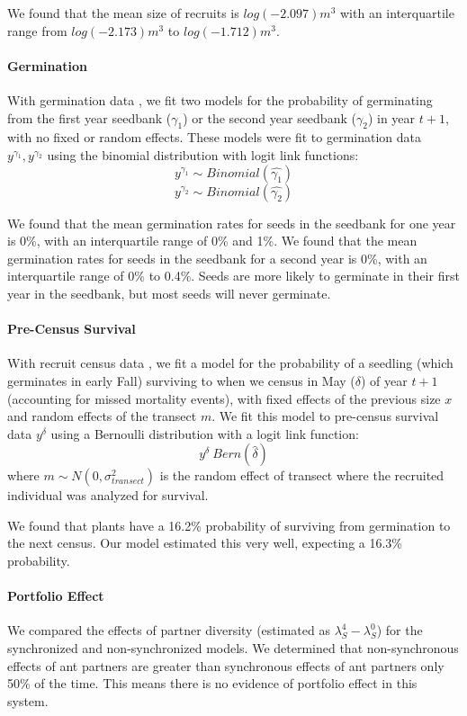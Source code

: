 \documentclass[11pt]{article}
\begin{document}
We found that the mean size of recruits is $log(-2.097) m^3$ with an interquartile range from $log(-2.173) m^3$ to $log(-1.712) m^3$.



\paragraph{Germination}
With germination data \cite{Miller2007}, we fit two models for the probability of germinating from the first year seedbank ($\gamma_1$) or the second year seedbank ($\gamma_2$) in year $t+1$, with no fixed or random effects.
These models were fit to germination data $y^{\gamma_1}, y^{\gamma_2}$  using the binomial distribution with logit link functions:
$$y^{\gamma_1} \sim Binomial(\hat{\gamma_1})$$
$$y^{\gamma_2} \sim Binomial(\hat{\gamma_2})$$

We found that the mean germination rates for seeds in the seedbank for one year  is 0\%, with an interquartile range of 0\% and 1\%.
We found that the mean germination rates for seeds in the seedbank for a second year is 0\%, with an interquartile range of 0\% to 0.4\%.
Seeds are more likely to germinate in their first year in the seedbank, but most seeds will never germinate. 

\paragraph{Pre-Census Survival}
With recruit census data \cite{Miller2006}, we fit a model for the probability of a seedling (which germinates in early Fall) surviving to when we census in May ($\delta$) of year $t+1$ (accounting for missed mortality events), with fixed effects of the previous size $x$ and random effects of the transect $m$.
We fit this model to pre-census survival data $y^{\delta}$ using a Bernoulli distribution with a logit link function: 
$$y^{\delta} ~ Bern(\hat{\delta})$$
where $m \sim N(0, \sigma_{transect}^2)$ is the random effect of transect where the recruited individual was analyzed for survival.

We found that plants have a 16.2\% probability of surviving from germination to the next census.
Our model estimated this very well, expecting a 16.3\% probability.


\paragraph{Portfolio Effect}
We compared the effects of partner diversity (estimated as $\lambda_S^4 - \lambda_S^0$) for the synchronized and non-synchronized models.
We determined that non-synchronous effects of ant partners are greater than synchronous effects of ant partners only 50\% of the time.
This means there is no evidence of portfolio effect in this system.
\end{document}

